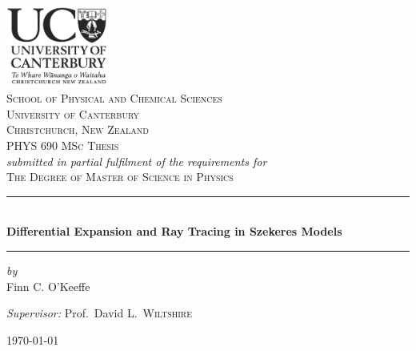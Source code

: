 \documentclass[a4paper,12pt]{report}
\begin{document}
\begin{center}
\includegraphics[width=0.25\textwidth]{UClogo}\\[0mm]
\textsc{School of Physical and Chemical Sciences\\University of Canterbury\\Christchurch, New Zealand}\\[10mm]
\textsc{\Large PHYS 690 MSc Thesis}\\
\vspace{3mm}
\textit{submitted in partial fulfilment of the requirements for}\\
\vspace{3mm}
\textsc{\Large The Degree of Master of Science in Physics}\\


\rule{\textwidth}{0.4pt}\\[2mm]
{ \huge \bfseries Differential Expansion and Ray Tracing in Szekeres Models\\
\vspace{5mm}
}
\rule{\textwidth}{0.4pt}\vspace*{-\baselineskip}\vspace{3.2pt}
\vspace{2pt}


\large \emph{by}\\[5mm]
{\huge Finn C. O'Keeffe}\\

\vspace{10mm}

{ \large
\emph{Supervisor: }
Prof.~David L.~\textsc{Wiltshire}
}

\vfill
{\large \today}
\end{center}
\cleardoublepage
\end{document}
